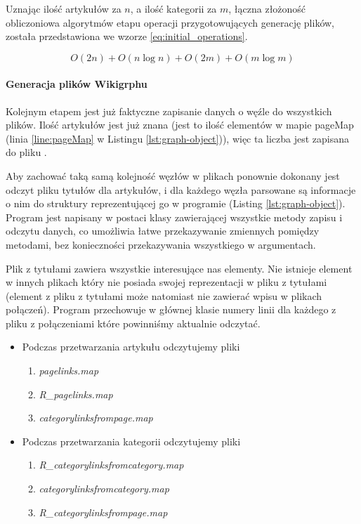 Uznając ilość artykułów za $n$, a ilość kategorii za $m$, łączna złożoność obliczoniowa algorytmów etapu operacji przygotowujących generację plików, została przedstawiona we wzorze \ref{eq:initial_operations}.

\begin{equation}
O(2n) + O(n\log n) + O(2m) + O(m \log m)
\label{eq:initial_operations}
\end{equation}

\paragraph{Generacja plików Wikigrphu}
Kolejnym etapem jest już faktyczne zapisanie danych o węźle do wszystkich plików. Ilość artykułów jest już znana (jest to ilość elementów w mapie pageMap (linia \ref{line:pageMap} w Listingu \ref{lst:graph-object})), więc ta liczba jest zapisana do pliku .

Aby zachować taką samą kolejność węzłów w plikach ponownie dokonany jest odczyt pliku tytułów dla artykułów, i dla każdego węzła parsowane są informacje o nim do struktury reprezentującej go w programie (Listing \ref{lst:graph-object}). Program jest napisany w postaci klasy zawierającej wszystkie metody zapisu i odczytu danych, co umożliwia łatwe przekazywanie zmiennych pomiędzy metodami, bez konieczności przekazywania wszystkiego w argumentach.

Plik z tytułami zawiera wszystkie interesujące nas elementy. Nie istnieje element w innych plikach który nie posiada swojej reprezentacji w pliku z tytułami (element z pliku z tytułami może natomiast nie zawierać wpisu w plikach połączeń). Program przechowuje w głównej klasie numery linii dla każdego z pliku z połączeniami które powinniśmy aktualnie odczytać.

\begin{itemize}
\item Podczas przetwarzania artykułu odczytujemy pliki
\begin{enumerate}[label=\textbullet]
    \item  \textit{pagelinks.map}
    \item  \textit{R\_pagelinks.map}
    \item  \textit{categorylinksfrompage.map}
\end{enumerate}
\item Podczas przetwarzania kategorii odczytujemy pliki
\begin{enumerate}[label=\textbullet]
    \item  \textit{R\_categorylinksfromcategory.map}
    \item  \textit{categorylinksfromcategory.map}
    \item  \textit{R\_categorylinksfrompage.map}
\end{enumerate}
\end{itemize}

